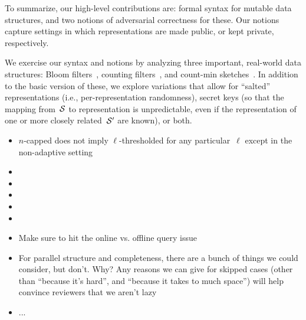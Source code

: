 To summarize, our high-level contributions are: formal syntax for
mutable data structures, and two notions of adversarial 
correctness for these.  Our notions capture settings in which representations
are made public, or kept private, respectively.

We exercise our syntax and notions by
analyzing three important, real-world data structures: Bloom
filters~\cite{xxx}, counting filters~\cite{xxx}, and count-min
sketches~\cite{xxx}. 
In addition to the basic version of these, we
explore variations that allow for ``salted'' representations (i.e.,
per-representation randomness), secret keys (so that the mapping
from~$\mathcal{S}$ to representation is unpredictable, even if the
representation of one or more closely related~$\mathcal{S}'$ are known), or both.

%

\begin{itemize}
\item $n$-capped does not imply $\ell$-thresholded for any
  particular~$\ell$ except in the non-adaptive setting
\item {}
\item {}
\item {}
\item {}
\item {}
\item Make sure to hit the online vs. offline query issue
\item For parallel structure and completeness, there are a bunch of
  things we could consider, but don't.  Why?  Any reasons we can give
  for skipped cases (other than ``because it's hard'', and ``because
  it takes to much space'') will help convince reviewers that we
  aren't lazy
\item ...
\end{itemize}

